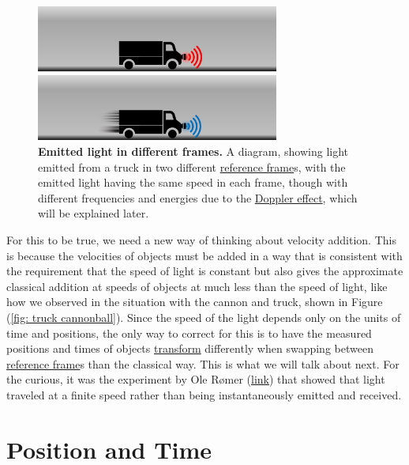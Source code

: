 \begin{figure}[H]
	\centering
	\includegraphics[width = 8cm]{images/pdf/lorry_torch.pdf}
	\caption{\textbf{Emitted light in different frames.} A diagram, showing light emitted from a truck in two different \protect\hyperlink{def-Reference-frame}{reference frame}s, with the emitted light having the same speed in each frame, though with different frequencies and energies due to the \protect\hyperlink{def-doppler-effect}{Doppler effect}, which will be explained later.}
	\label{fig: truck torch}
\end{figure}

For this to be true, we need a new way of thinking about velocity addition.
This is because the velocities of objects must be added in a way that is consistent with the requirement that the speed of light is constant but also gives the approximate classical addition at speeds of objects at much less than the speed of light, like how we observed in the situation with the cannon and truck, shown in Figure (\ref{fig: truck cannonball}).
Since the speed of the light depends only on the units of time and positions, the only way to correct for this is to have the measured positions and times of objects \hyperlink{def-transform}{transform} differently when swapping between \hyperlink{def-Reference-frame}{reference frame}s than the classical way.
This is what we will talk about next.
For the curious, it was the experiment by Ole Rømer (\href{https://scienceready.com.au/pages/determination-of-speed-of-light}{link}) that showed that light traveled at a finite speed rather than being instantaneously emitted and received.

\section{Position and Time} \label{sect: Position and Time}

